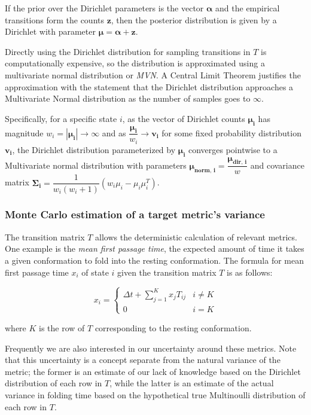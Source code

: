 \documentclass{article}
\begin{document}
If the prior over the Dirichlet parameters is the vector $\boldsymbol{\alpha}$ and the empirical transitions form the counts $\boldsymbol{z}$, then the posterior distribution is given by a Dirichlet with parameter $\boldsymbol{\mu} = \boldsymbol{\alpha} + \boldsymbol{z}$.

Directly using the Dirichlet distribution for sampling transitions in $T$ is computationally expensive, so the distribution is approximated using a multivariate normal distribution or \textit{MVN}. A Central Limit Theorem justifies the approximation with the statement that the Dirichlet distribution approaches a Multivariate Normal distribution as the number of samples goes to $\infty$. 

Specifically, for a specific state $i$, as the vector of Dirichlet counts $\boldsymbol{\mu_i}$ has magnitude $w_i = |\boldsymbol{\mu_i}| \to \infty$ and as $\dfrac{\boldsymbol{\mu_i}}{w_i} \to \boldsymbol{v_i}$ for some fixed probability distribution $\boldsymbol{v_i}$, the Dirichlet distribution parameterized by $\boldsymbol{\mu_i}$ converges pointwise to a Multivariate normal distribution with parameters $\boldsymbol{\mu_{\text{norm, i}}} = \dfrac{\boldsymbol{\mu_{\text{dir, i}}}}{w}$ and covariance matrix $\boldsymbol{\Sigma_i} = \dfrac{1}{w_i(w_i+1)}(w_i\mu_i - \mu_i\mu^T_i)$.

\subsubsection{Monte Carlo estimation of a target metric's variance}
The transition matrix $T$ allows the deterministic calculation of relevant metrics. One example is the \textit{mean first passage time}, the expected amount of time it takes a given conformation to fold into the resting conformation. The formula for mean first passage time $x_i$ of state $i$ given the transition matrix $T$ is as follows:

\begin{equation*}
    x_i =
    \begin{cases}
    \Delta t + \sum_{j=1}^K x_jT_{ij} & i \neq K \\
    0 & i = K
    \end{cases}
\end{equation*}

\noindent where $K$ is the row of $T$ corresponding to the resting conformation.

Frequently we are also interested in our uncertainty around these metrics. Note that this uncertainty is a concept separate from the natural variance of the metric; the former is an estimate of our lack of knowledge based on the Dirichlet distribution of each row in $T$, while the latter is an estimate of the actual variance in folding time based on the hypothetical true Multinoulli distribution of each row in $T$. 
\end{document}
